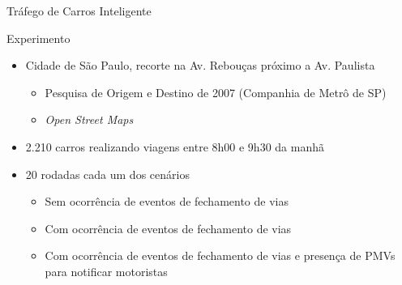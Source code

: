 \documentclass[xcolor={usenames,svgnames,dvipsnames},brazil,english,12pt,aspectratio=149]{beamer}
\begin{document}
\begin{frame}{Tráfego de Carros Inteligente}
    \begin{block}{Experimento}
        \begin{itemize}
            \item Cidade de São Paulo, recorte na Av. Rebouças próximo a Av. Paulista
                \begin{itemize}
                    \item Pesquisa de Origem e Destino de 2007 (Companhia de Metrô de SP)
                    \item \textit{Open Street Maps}
                \end{itemize}
            \item 2.210 carros realizando viagens entre 8h00 e 9h30 da manhã
            \item 20 rodadas cada um dos cenários
                \begin{itemize}
                    \item Sem ocorrência de eventos de fechamento de vias
                    \item Com ocorrência de eventos de fechamento de vias
                    \item Com ocorrência de eventos de fechamento de vias e presença de PMVs para notificar motoristas
                \end{itemize}
        \end{itemize}
    \end{block}
\end{frame}
\end{document}
